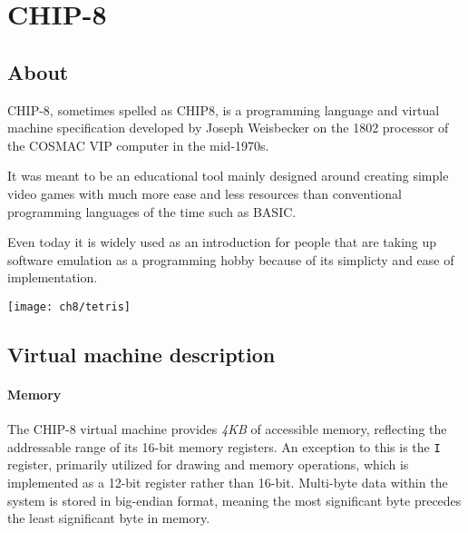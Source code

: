 \clearpage

\chapter{CHIP-8}
\label{chap:ch3}

\section{About}
\label{sec:ch3sec1}

\par CHIP-8, sometimes spelled as CHIP8, is a programming language and virtual machine specification developed by Joseph Weisbecker on the 1802 processor of the COSMAC VIP computer in the mid-1970s.

\par It was meant to be an educational tool mainly designed around creating simple video games with much more ease and less resources than conventional programming languages of the time such as BASIC.

\par Even today it is widely used as an introduction for people that are taking up software emulation as a programming hobby because of its simplicty and ease of implementation.

\vspace{1cm}

\begin{minipage}{\linewidth}
\texttt{[image: ch8/tetris]}
\end{minipage}

\clearpage

\section{Virtual machine description}
\label{sec:ch3sec2}

\subsubsection{Memory}

\par The CHIP-8 virtual machine provides \textit{4KB} of accessible memory, reflecting the addressable range of its 16-bit memory registers. An exception to this is the \texttt{I} register, primarily utilized for drawing and memory operations, which is implemented as a 12-bit register rather than 16-bit. Multi-byte data within the system is stored in big-endian format, meaning the most significant byte precedes the least significant byte in memory.

